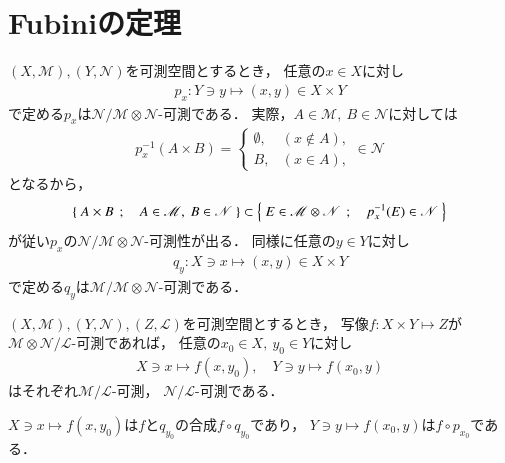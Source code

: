 \section{Fubiniの定理}
	$(X,\mathscr{M}),(Y,\mathscr{N})$を可測空間とするとき，
	任意の$x \in X$に対し
	\begin{align}
		p_x:Y \ni y \longmapsto (x,y) \in X \times Y
	\end{align}
	で定める$p_x$は$\mathscr{N}/\mathscr{M} \otimes \mathscr{N}$-可測である．
	実際，$A \in \mathscr{M},\ B \in \mathscr{N}$に対しては
	\begin{align}
		p_x^{-1}(A \times B) = 
		\begin{cases}
			\emptyset, & (x \notin A), \\
			B, & (x \in A),
		\end{cases}
		\in \mathscr{N}
	\end{align}
	となるから，
	\begin{align}
		\left\{\ A \times B\ \, ; \quad A \in \mathscr{M},\ B \in \mathscr{N}\ \right\}
		\subset \left\{\ E \in \mathscr{M} \otimes \mathscr{N}\ \, ; \quad p_x^{-1}(E) \in \mathscr{N}\ \right\}
	\end{align}
	が従い$p_x$の$\mathscr{N}/\mathscr{M} \otimes \mathscr{N}$-可測性が出る．
	同様に任意の$y \in Y$に対し
	\begin{align}
		q_y:X \ni x \longmapsto (x,y) \in X \times Y
	\end{align}
	で定める$q_y$は$\mathscr{M}/\mathscr{M} \otimes \mathscr{N}$-可測である．
	
	\begin{screen}
		\begin{lem}[二変数可測写像は片変数で可測]\label{lem:Fubini_lemma_1}
			$(X,\mathscr{M}),(Y,\mathscr{N}),(Z,\mathscr{L})$を可測空間とするとき，
			写像$f: X \times Y \longmapsto Z$が
			$\mathscr{M}\otimes \mathscr{N}/ \mathscr{L}$-可測であれば，
			任意の$x_0 \in X,\ y_0 \in Y$に対し
			\begin{align}
				X \ni x \longmapsto f(x,y_0),
				\quad Y \ni y \longmapsto f(x_0,y)
			\end{align}
			はそれぞれ$\mathscr{M}/\mathscr{L}$-可測，
			$\mathscr{N}/\mathscr{L}$-可測である．
		\end{lem}
	\end{screen}
	
	\begin{prf}
		$X \ni x \longmapsto f(x,y_0)$は$f$と$q_{y_0}$の合成$f \circ q_{y_0}$であり，
		$Y \ni y \longmapsto f(x_0,y)$は$f \circ p_{x_0}$である．
		\QED
	\end{prf}
	
